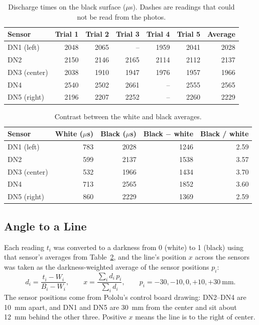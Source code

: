 \documentclass[11pt]{article}
\begin{document}
\begin{table}[H]
  \centering
  \caption{Discharge times on the black surface ($\mu$s). Dashes are readings that could not be read from the photos.}
  \label{tab:black}
  \begin{tabular}{lrrrrrr}
    \toprule
    Sensor & Trial 1 & Trial 2 & Trial 3 & Trial 4 & Trial 5 & Average \\
    \midrule
    DN1 (left)   & 2048 & 2065 & --   & 1959 & 2041 & 2028 \\
    DN2          & 2150 & 2146 & 2165 & 2114 & 2112 & 2137 \\
    DN3 (center) & 2038 & 1910 & 1947 & 1976 & 1957 & 1966 \\
    DN4          & 2540 & 2502 & 2661 & --   & 2555 & 2565 \\
    DN5 (right)  & 2196 & 2207 & 2252 & --   & 2260 & 2229 \\
    \bottomrule
  \end{tabular}
\end{table}

\begin{table}[H]
  \centering
  \caption{Contrast between the white and black averages.}
  \label{tab:contrast}
  \begin{tabular}{lrrrr}
    \toprule
    Sensor & White ($\mu$s) & Black ($\mu$s) & Black $-$ white & Black / white \\
    \midrule
    DN1 (left)   & 783 & 2028 & 1246 & 2.59 \\
    DN2          & 599 & 2137 & 1538 & 3.57 \\
    DN3 (center) & 532 & 1966 & 1434 & 3.70 \\
    DN4          & 713 & 2565 & 1852 & 3.60 \\
    DN5 (right)  & 860 & 2229 & 1369 & 2.59 \\
    \bottomrule
  \end{tabular}
\end{table}

\subsection{Angle to a Line}
Each reading $t_i$ was converted to a darkness from 0 (white) to 1 (black) using that sensor's averages from Table~\ref{tab:contrast}, and the line's position $x$ across the sensors was taken as the darkness-weighted average of the sensor positions $p_i$:
\begin{equation}
  d_i = \frac{t_i - W_i}{B_i - W_i}, \qquad
  x = \frac{\sum_i d_i \, p_i}{\sum_i d_i}, \qquad
  p_i = -30, -10, 0, +10, +30~\text{mm}.
  \label{eq:position}
\end{equation}
The sensor positions come from Pololu's control board drawing: DN2--DN4 are 10~mm apart, and DN1 and DN5 are 30~mm from the center and sit about 12~mm behind the other three. Positive $x$ means the line is to the right of center.
\end{document}
